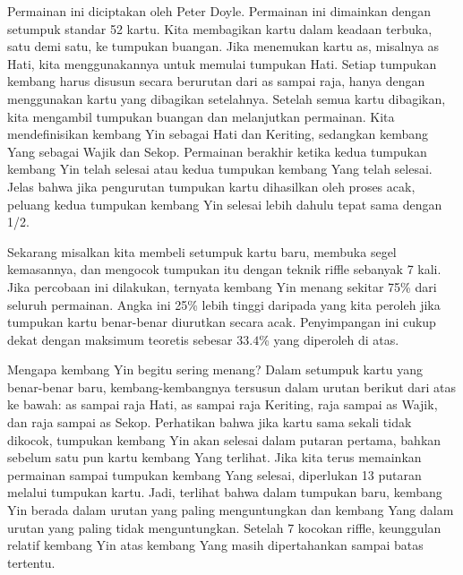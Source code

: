 Permainan ini diciptakan oleh Peter Doyle.  Permainan ini dimainkan dengan setumpuk
standar 52 kartu.  Kita membagikan kartu dalam keadaan terbuka, satu demi satu, ke
tumpukan buangan.  Jika menemukan kartu as, misalnya as Hati, kita menggunakannya untuk
memulai tumpukan Hati.  Setiap tumpukan kembang harus disusun secara berurutan dari as
sampai raja, hanya dengan menggunakan kartu yang dibagikan setelahnya.  Setelah semua
kartu dibagikan, kita mengambil tumpukan buangan dan melanjutkan permainan.  Kita
mendefinisikan kembang Yin sebagai Hati dan Keriting, sedangkan kembang
Yang sebagai Wajik dan Sekop.  Permainan berakhir ketika kedua tumpukan
kembang Yin telah selesai atau kedua tumpukan kembang Yang telah selesai.  Jelas bahwa
jika pengurutan tumpukan kartu dihasilkan oleh proses acak, peluang kedua tumpukan
kembang Yin selesai lebih dahulu tepat sama dengan 1/2.
\par Sekarang misalkan kita membeli setumpuk kartu baru, membuka segel kemasannya, dan
mengocok tumpukan itu dengan teknik riffle sebanyak 7 kali.  Jika percobaan ini dilakukan,
ternyata kembang Yin menang sekitar 75\% dari seluruh permainan.  Angka ini 25\% lebih
tinggi daripada yang kita peroleh jika tumpukan kartu benar-benar
diurutkan secara acak.  Penyimpangan ini cukup dekat dengan maksimum teoretis sebesar
$33.4$\% yang diperoleh di atas.
\par Mengapa kembang Yin begitu sering menang?  Dalam setumpuk kartu yang benar-benar
baru, kembang-kembangnya tersusun dalam urutan berikut dari atas ke bawah: as sampai raja
Hati, as sampai raja Keriting, raja sampai as Wajik, dan raja sampai as Sekop.  Perhatikan
bahwa jika kartu sama sekali tidak dikocok, tumpukan kembang Yin akan selesai dalam
putaran pertama, bahkan sebelum satu pun kartu kembang Yang terlihat.  Jika kita terus
memainkan permainan sampai tumpukan kembang Yang selesai, diperlukan 13 putaran melalui
tumpukan kartu.  Jadi, terlihat bahwa dalam tumpukan baru, kembang Yin berada dalam
urutan yang paling menguntungkan dan kembang Yang dalam urutan yang paling tidak
menguntungkan.  Setelah 7 kocokan riffle, keunggulan relatif kembang Yin atas kembang
Yang masih dipertahankan sampai batas tertentu.

